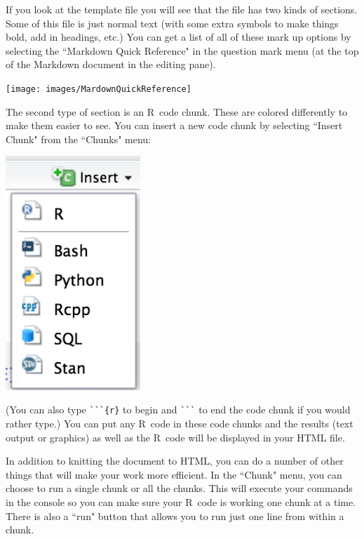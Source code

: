 \documentclass[twoside]{book}\usepackage[]{graphicx}\usepackage[]{xcolor}
\def\R{{\sf R}}
\begin{document}
If you look at the template file you will see that the file has two kinds of
sections.  Some of this file is just normal text (with some extra symbols to
make things bold, add in headings, etc.)  You can get a list of all of these
mark up options by selecting the ``Markdown Quick Reference" in the question
mark menu (at the top of the Markdown document in the editing pane).

\begin{center}
	\texttt{[image: images/MardownQuickReference]}
\end{center}

The second type of section is an \R\ code chunk.  These are colored differently to make them
easier to see.  You can insert a new code chunk by selecting ``Insert Chunk" from the ``Chunks" 
menu:
\begin{center}
	\includegraphics[width=2in]{images/InsertChunk}
\end{center}
\noindent
(You can also type \verb!```{r}! to begin and \verb!```! to end the code chunk if you would 
rather type.)
You can put any \R\ code in these code chunks and the results (text output or graphics) as well
as the \R\ code will be displayed in your HTML file.

In addition to knitting the document to HTML, you can do a number of other things that will
make your work more efficient.  In the ``Chunk" menu, you can choose to run a single chunk 
or all the chunks.  This will execute your commands in the console so you can make sure 
your \R\ code is working one chunk at a time.  There is also a ``run" button that allows you
to run just one line from within a chunk.

\end{document}

